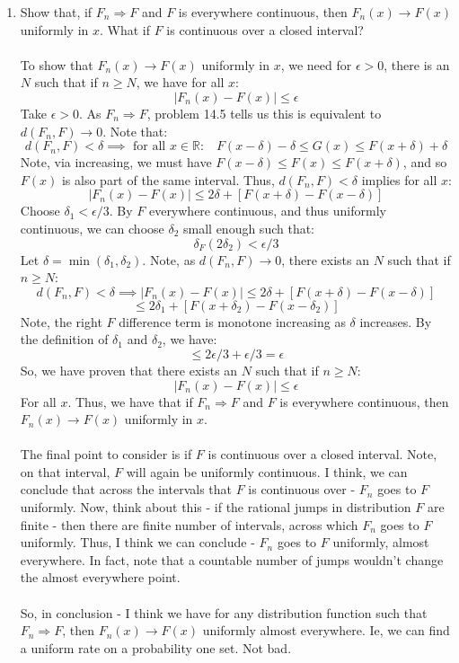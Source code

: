 \documentclass[12pt,a4paper]{article}
\newcommand{\1}[1]{\mathbbm{1}\left\{ #1 \right\}}
\newcommand{\R}{\mathbb{R}}
\begin{document}
\begin{enumerate}
	\item Show that, if $F_n \Rightarrow F$ and $F$ is everywhere continuous, then $F_n(x) \to F(x)$ uniformly in $x$. What if $F$ is continuous over a closed interval?
	\\\\
	To show that $F_n(x) \to F(x)$ uniformly in $x$, we need for $\epsilon > 0$, there is an $N$ such that if $n \geq N$, we have for all $x$:
	$$
		|F_n(x) - F(x)| \leq \epsilon
	$$
	Take $\epsilon > 0$. As $F_n \Rightarrow F$, problem 14.5 tells us this is equivalent to $d(F_n,F) \to 0$. Note that:
	$$
		d(F_n,F) < \delta \implies \text{ for all $x \in \R$:}
		\quad
		F(x - \delta) - \delta \leq G(x) \leq F(x + \delta) + \delta
	$$
	Note, via increasing, we must have $F(x - \delta) \leq F(x) \leq F(x + \delta)$, and so $F(x)$ is also part of the same interval. Thus, $d(F_n,F) < \delta$ implies for all $x$:
	$$
		\left|F_n(x) - F(x)\right| \leq 2\delta + \left[F(x + \delta) - F(x - \delta)\right]
	$$
	Choose $\delta_1 < \epsilon/3$. By $F$ everywhere continuous, and thus uniformly continuous, we can choose $\delta_2$ small enough such that:
	$$
		\delta_F(2\delta_2) < \epsilon/3
	$$
	Let $\delta = \min(\delta_1,\delta_2)$. Note, as $d(F_n,F) \to 0$, there exists an $N$ such that if $n \geq N$:
	$$
		d(F_n,F) < \delta \implies
		\left|F_n(x) - F(x)\right| \leq 2\delta + \left[F(x + \delta) - F(x - \delta)\right]
	$$
	$$
		\leq 2\delta_1 + \left[F(x + \delta_2) - F(x - \delta_2)\right]
	$$
	Note, the right $F$ difference term is monotone increasing as $\delta$ increases. By the definition of $\delta_1$ and $\delta_2$, we have:
	$$
		\leq 2\epsilon/3 + \epsilon/3 = \epsilon
	$$
	So, we have proven that there exists an $N$ such that if $n \geq N$:
	$$
		\left|F_n(x) - F(x)\right| \leq \epsilon
	$$
	For all $x$. Thus, we have that if $F_n \Rightarrow F$ and $F$ is everywhere continuous, then $F_n(x) \to F(x)$ uniformly in $x$.
	\\\\
	The final point to consider is if $F$ is continuous over a closed interval. Note, on that interval, $F$ will again be uniformly continuous. I think, we can conclude that across the intervals that $F$ is continuous over - $F_n$ goes to $F$ uniformly. Now, think about this - if the rational jumps in distribution $F$ are finite - then there are finite number of intervals, across which $F_n$ goes to $F$ uniformly. Thus, I think we can conclude - $F_n$ goes to $F$ uniformly, almost everywhere. In fact, note that a countable number of jumps wouldn't change the almost everywhere point.
	\\\\
	So, in conclusion - I think we have for any distribution function such that $F_n \Rightarrow F$, then $F_n(x) \to F(x)$ uniformly almost everywhere. Ie, we can find a uniform rate on a probability one set. Not bad.
	
\end{enumerate}
\end{document}
